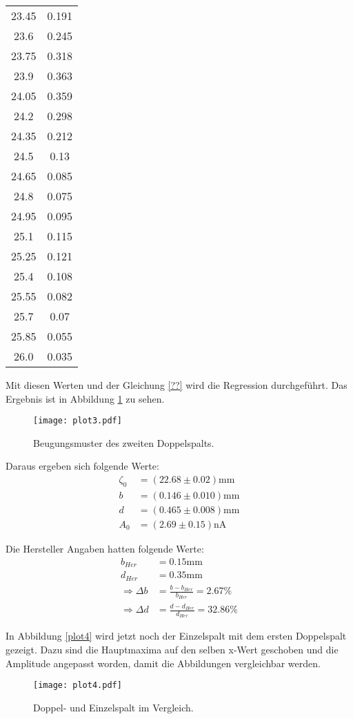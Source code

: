 \begin{table}
\begin{tabular}{c c}
  23.45  &  0.191 \\
  23.6  &  0.245 \\
  23.75  &  0.318 \\
  23.9  &  0.363 \\
  24.05  &  0.359 \\
  24.2  &  0.298 \\
  24.35  &  0.212 \\
  24.5  &  0.13 \\
  24.65  &  0.085 \\
  24.8  &  0.075 \\
  24.95  &  0.095 \\
  25.1  &  0.115 \\
  25.25  &  0.121 \\
  25.4  &  0.108 \\
  25.55  &  0.082 \\
  25.7  &  0.07 \\
  25.85  &  0.055 \\
  26.0  &  0.035 \\
  \bottomrule
\end{tabular}
\end{table}
\FloatBarrier

Mit diesen Werten und der Gleichung \eqref{??} wird die Regression durchgeführt.
Das Ergebnis ist in Abbildung \ref{fig:plot3} zu sehen.

\begin{figure}
  \centering
  \texttt{[image: plot3.pdf]}
  \caption{Beugungsmuster des zweiten Doppelspalts.}
  \label{fig:plot3}
\end{figure}
\FloatBarrier

Daraus ergeben sich folgende Werte:
\begin{align*}
  \zeta_0 &= (22.68 \pm 0.02) \text{mm} \\
  b &= (0.146 \pm 0.010) \text{mm} \\
  d &= (0.465 \pm 0.008) \text{mm} \\
  A_0 &= (2.69 \pm 0.15) \text{nA}
\end{align*}

Die Hersteller Angaben hatten folgende Werte:
\begin{align*}
  b_{Her} &= 0.15 \text{mm} \\
  d_{Her} &= 0.35 \text{mm} \\
  \Rightarrow \Delta b &= \frac{b - b_{Her}}{b_{Her}} = 2.67\% \\
  \Rightarrow \Delta d &= \frac{d - d_{Her}}{d_{Her}} = 32.86\%
\end{align*}

In Abbildung \ref{plot4} wird jetzt noch der Einzelspalt mit dem ersten Doppelspalt gezeigt.
Dazu sind die Hauptmaxima auf den selben x-Wert geschoben und die Amplitude angepasst worden, damit die Abbildungen vergleichbar werden.

\begin{figure}
  \centering
  \texttt{[image: plot4.pdf]}
  \caption{Doppel- und Einzelspalt im Vergleich.}
  \label{fig:plot4}
\end{figure}
\FloatBarrier